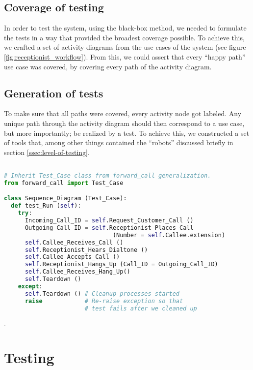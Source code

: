 \subsection{Coverage of testing}
In order to test the system, using the black-box method, we needed to formulate the tests in a way that provided the broadest coverage possible. To achieve this, we crafted a set of activity diagrams from the use cases of the system (see figure \ref{fig:receptionist_workflow}). From this, we could assert that every ``happy path'' use case was covered, by covering every path of the activity diagram.

\subsection{Generation of tests}
To make sure that all paths were covered, every activity node got labeled. Any unique path through the activity diagram should then correspond to a use case, but more importantly; be realized by a test. To achieve this, we constructed a set of tools that, among other things contained the ``robots'' discussed briefly in section \ref{ssec:level-of-testing}.

\begin{lstlisting}[language=Python, caption=Example of a generated test, label=fig:python_test]

# Inherit Test_Case class from forward_call generalization.
from forward_call import Test_Case

class Sequence_Diagram (Test_Case):
  def test_Run (self):
    try:
      Incoming_Call_ID = self.Request_Customer_Call ()
      Outgoing_Call_ID = self.Receptionist_Places_Call 
                               (Number = self.Callee.extension)
      self.Callee_Receives_Call ()
      self.Receptionist_Hears_Dialtone ()
      self.Callee_Accepts_Call ()
      self.Receptionist_Hangs_Up (Call_ID = Outgoing_Call_ID)
      self.Callee_Receives_Hang_Up()
      self.Teardown ()
    except:
      self.Teardown () # Cleanup processes started
      raise            # Re-raise exception so that 
                       # test fails after we cleaned up
\end{lstlisting}

.

\section{Testing}

